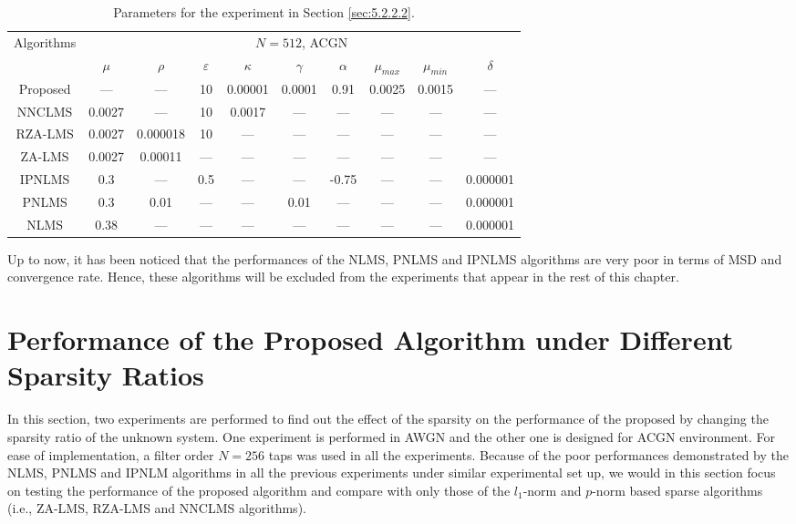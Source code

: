 \begin{table}[!htb]
\centering
\caption{Parameters for the experiment in Section \ref{sec:5.2.2.2}.}
\vspace{0.5cm}
\begin{tabular}{|c|c|c|c|c|c|c|c|c|c|}
 \hline
    \multirow{2}{*}{Algorithms} & \multicolumn{9}{c|}{$N=512$, ACGN}\\
    \cline{2-10}
    & $\mu$ & $\rho$ & $\varepsilon$ & $\kappa$ & $\gamma$ &$\alpha$ &$\mu_{max}$& $\mu_{min}$ & $\delta$\\
    \hline
     Proposed  & --- & --- & 10 & 0.00001 & 0.0001& 0.91 & 0.0025 & 0.0015 & --- \\ \hline
     NNCLMS  &0.0027 & --- & 10  & 0.0017 & --- & --- & --- & --- & ---  \\ \hline
   RZA-LMS & 0.0027 &0.000018 & 10 & --- & --- & --- & ---  & --- & --- \\ \hline
   ZA-LMS  & 0.0027 & 0.00011 & --- & --- & --- & --- & --- & --- & --- \\ \hline
   IPNLMS & 0.3 & --- & 0.5 & --- & --- & -0.75 & --- & --- & 0.000001 \\ \hline
   PNLMS & 0.3 & 0.01 & --- & --- & 0.01 & --- & --- & --- & 0.000001  \\ \hline
   NLMS & 0.38 & --- & --- & --- & --- & --- & --- & --- &  0.000001  \\ \hline
\end{tabular}
\label{table4}
 \end{table}

Up to now, it has been noticed that the performances of the NLMS, PNLMS and IPNLMS algorithms are very poor in terms of MSD and convergence rate. Hence, these algorithms will be excluded from the experiments that appear in the rest of this chapter.


\vspace{-0.3cm}
\section{Performance of the Proposed Algorithm under Different Sparsity Ratios}\label{sec:5.3}
\vspace{-0.5cm}
\noindent In this section, two experiments are performed to find out the effect of the sparsity on the performance of the proposed  by changing the sparsity ratio of the unknown system. One experiment is performed in AWGN and the other one is designed for ACGN environment. For ease of implementation, a filter order $N=256$ taps was used in all the experiments. Because of the poor performances demonstrated by the NLMS, PNLMS and IPNLM algorithms in all the previous experiments under similar experimental set up, we would in this section  focus on testing the performance of the proposed algorithm and compare with only those of the $l_1$-norm and $p$-norm based sparse algorithms (i.e., ZA-LMS, RZA-LMS and NNCLMS algorithms).

